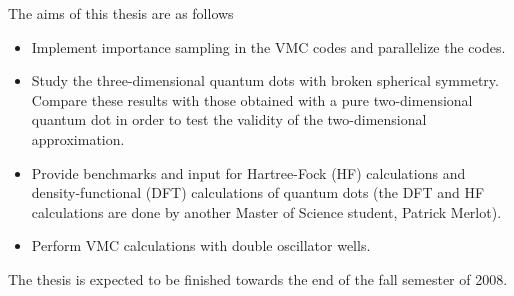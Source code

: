 The aims of this thesis are as follows

\begin{itemize}
\item Implement importance sampling in the VMC codes and parallelize the codes.
\item Study the three-dimensional quantum dots  with broken spherical symmetry.
Compare these results with those obtained with a pure two-dimensional quantum dot in order to
test the validity of the two-dimensional approximation.
\item Provide benchmarks and input for Hartree-Fock (HF) calculations and density-functional (DFT) calculations  of quantum dots
(the DFT and HF calculations are done by another Master of Science student, Patrick Merlot).
\item Perform VMC calculations with double oscillator wells.
\end{itemize}



The thesis is expected to be finished towards the end  of the fall 
semester of 2008.



